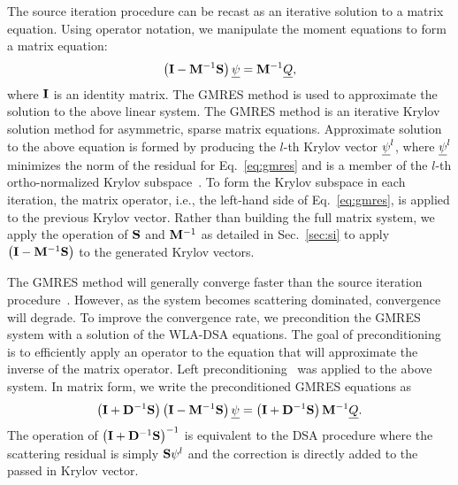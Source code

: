 The source iteration procedure can be recast as an iterative solution to a matrix
equation. Using operator notation, we manipulate
the moment equations to form a matrix equation:
\begin{equation}\label{eq:gmres}
    \left(\mathbf{I}  - \mathbf{M}^{-1}\mathbf{S}\right) \underline{\psi} = \mathbf{M}^{-1} \underline{Q},
\end{equation}
where $\mathbf{I}$ is an identity matrix.  The GMRES method is used to approximate
the solution to the above
linear system. The GMRES method is an iterative Krylov solution method for asymmetric, sparse matrix
equations.  Approximate solution to the above equation is formed by producing the $l$-th
Krylov vector $\underline{\psi}^l$, where $\underline{\psi}^l$ minimizes the norm of the residual for
Eq.~\eqref{eq:gmres} and is a member of the $l$-th ortho-normalized Krylov
subspace~\cite{saad}.  To form the Krylov subspace in each iteration, the
matrix operator, i.e., the left-hand side of Eq.~\eqref{eq:gmres}, is applied to the
previous Krylov vector.  Rather than building the full matrix system, we apply the
operation of $\mathbf{S}$ and $\mathbf{M}^{-1}$ as detailed in Sec.~\eqref{sec:si} to apply $\left(\mathbf{I}  - \mathbf{M}^{-1}\mathbf{S}\right)$ to the generated Krylov vectors. 

The GMRES method will generally converge faster than the source iteration
procedure~\cite{larson_morel_sn}.  However, as the system becomes scattering dominated,
convergence will degrade.  To improve the convergence rate, we precondition the GMRES
system with a solution of the WLA-DSA equations.  The goal of preconditioning is to efficiently apply an
operator to the equation that will approximate the inverse of the matrix operator. Left
preconditioning~\cite{saad} was applied to the above system.  In matrix form, we write the preconditioned GMRES equations as
\begin{equation}
    \left(\mathbf{I} + \mathbf{D}^{-1} \mathbf{S}\right)\left(\mathbf{I} - \mathbf{M}^{-1} \mathbf{S} \right) \underline{\psi} = \left( \mathbf{I} + \mathbf{D}^{-1}\mathbf{S}\right) \mathbf{M}^{-1}\underline{Q}.
\end{equation}
The operation of $\left(\mathbf{I} + \mathbf{D}^{-1} \mathbf{S}\right)^{-1}$ is equivalent to the DSA
procedure where the scattering residual is simply $\mathbf{S} \psi^{l}$ and the correction is
directly added to the passed in Krylov vector.


